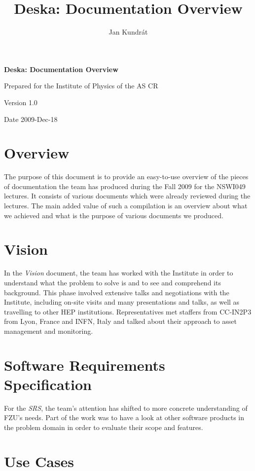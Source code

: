 \documentclass[12pt]{article}
\author{Jan Kundrát}
\title{Deska: Documentation Overview}
\begin{document}
{\Huge \textbf{Deska: Documentation Overview}}

\vspace{0.2in}

{\large Prepared for the Institute of Physics of the AS CR}

\vspace{0.2in}

{\large Version 1.0}

\vspace{0.2in}

{\large Date 2009-Dec-18}

\section{Overview}

The purpose of this document is to provide an easy-to-use overview of the pieces of documentation the team has produced during the
Fall 2009 for the NSWI049 lectures.  It consists of various documents which were already reviewed during the lectures.  The main
added value of such a compilation is an overview about what we achieved and what is the purpose of various documents we produced.

\section{Vision}

In the {\em Vision} document, the team has worked with the Institute in order to understand what the problem to solve is and to
see and comprehend its background.  This phase involved extensive talks and negotiations with the Institute, including on-site
visits and many presentations and talks, as well as travelling to other HEP institutions.  Representatives met staffers from
CC-IN2P3 from Lyon, France and INFN, Italy and talked about their approach to asset management and monitoring.

\section{Software Requirements Specification}

For the {\em SRS}, the team's attention has shifted to more concrete understanding of FZU's needs.  Part of the work was to have a
look at other software products in the problem domain in order to evaluate their scope and features.

\section{Use Cases}
\end{document}
